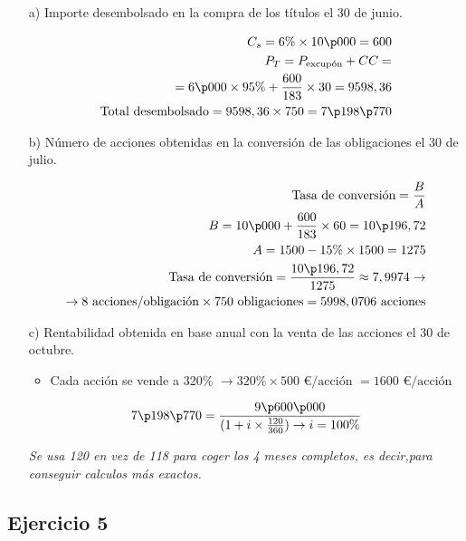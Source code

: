\begin{enumerate}
    \item[a)] Importe desembolsado en la compra de los títulos el 30 de junio.
    
    \begin{align*}
        C_s = 6\% \times 10\p000 = 600 \\
        P_T = P_{\text{excupón}} + CC = \\
        = 6\p000 \times 95\% + \frac{600}{183} \times 30 = 9598,36 \\
        \text{Total desembolsado} = 9598,36 \times 750 = 7\p198\p770
    \end{align*}

    \item[b)] Número de acciones obtenidas en la conversión de las obligaciones el 30 de julio.
    
    \begin{align*}
        \text{Tasa de conversión} = \frac{B}{A} \\
        B = 10\p000 + \frac{600}{183} \times 60 = 10\p196,72 \\
        A = 1500 - 15\% \times 1500 = 1275 \\
        \text{Tasa de conversión} = \frac{10\p196,72}{1275} \approx 7,9974 \rightarrow \\ \rightarrow 8 \text{ acciones/obligación} \times 750 \text{ obligaciones}= 5998, 0706 \text{ acciones}
\end{align*}

    \item[c)] Rentabilidad obtenida en base anual con la venta de las acciones el 30 de octubre.
    
    \begin{itemize}
        \item Cada acción se vende a 320\% $\rightarrow 320\% \times 500 \text{ €/acción } = 1600 \text{ €/acción}$
    \end{itemize}

    \begin{align*}
        7\p198\p770 = \frac{9\p600\p000}{(1 + i \times \frac{120}{360}) \rightarrow i = 100\%}
    \end{align*}

    \textit{Se usa 120 en vez de 118 para coger los 4 meses completos, es decir,para conseguir calculos más exactos.}

\end{enumerate}


\subsection*{Ejercicio 5}

